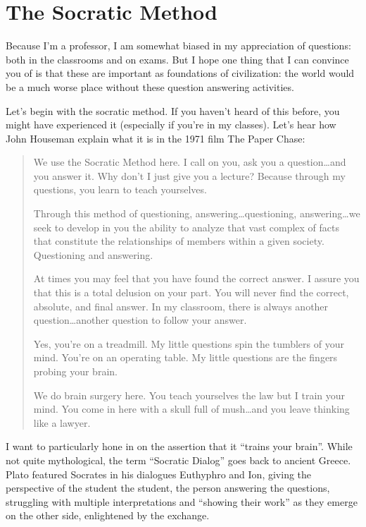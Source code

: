 \section{The Socratic Method}

Because I’m a professor, I am somewhat biased in my appreciation of questions: both in the classrooms and on exams.  But I hope one thing that I can convince you of is that these are important as foundations of civilization: the world would be a much worse place without these question answering activities.


Let’s begin with the socratic method.  If you haven’t heard of this before, you might have experienced it (especially if you’re in my classes).  Let’s hear how John Houseman explain what it is in the 1971 film The Paper Chase:
\begin{quote}
We use the Socratic Method here.  I call on you, ask you a question\dots and you answer it.  Why don't I just give you a lecture?  Because through my questions, you learn to teach yourselves.

Through this method of questioning, answering\dots questioning, answering\dots we seek to develop in you
the ability to analyze that vast complex of facts that constitute the relationships of members within a given society.  Questioning and answering.

At times you may feel that you have found the correct answer. I assure you that this is a total delusion on your part. You will never find the correct, absolute, and final answer.  In my classroom, there is always another question\dots another question to follow your answer.

Yes, you're on a treadmill.  My little questions spin the tumblers of your mind. You're on an operating table. My little questions are the fingers probing your brain.

We do brain surgery here.  You teach yourselves the law but I train your mind.  You come in here with a skull full of mush\dots and you leave thinking like a lawyer.
\end{quote}

I want to particularly hone in on the assertion that it ``trains your brain''.  While not quite mythological, the term ``Socratic Dialog'' goes back to ancient Greece.  Plato featured Socrates in his dialogues Euthyphro and Ion, giving the perspective of the student the student, the person answering the questions, struggling with multiple interpretations and ``showing their work'' as they emerge on the other side, enlightened by the exchange.

